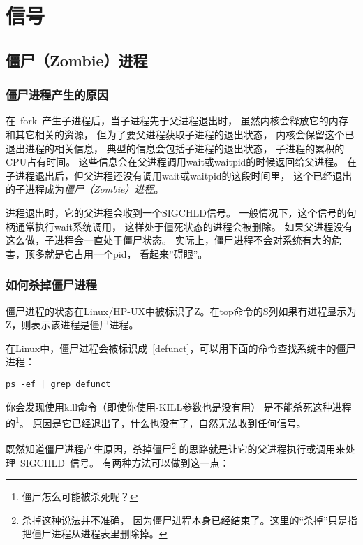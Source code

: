 
\chapter{信号}


\section{僵尸（Zombie）进程}

\subsection{僵尸进程产生的原因}

在~fork~产生子进程后，当子进程先于父进程退出时，
虽然内核会释放它的内存和其它相关的资源，
但为了要父进程获取子进程的退出状态，
内核会保留这个已退出进程的相关信息，
典型的信息会包括子进程的退出状态，
子进程的累积的CPU占有时间。
这些信息会在父进程调用wait或waitpid的时候返回给父进程。
在子进程退出后，但父进程还没有调用wait或waitpid的这段时间里，
这个已经退出的子进程成为\emph{僵尸（Zombie）进程}。

进程退出时，它的父进程会收到一个SIGCHLD信号。
一般情况下，这个信号的句柄通常执行wait系统调用，
这样处于僵死状态的进程会被删除。
如果父进程没有这么做，子进程会一直处于僵尸状态。
实际上，僵尸进程不会对系统有大的危害，顶多就是它占用一个pid，
看起来''碍眼''。

\subsection{如何杀掉僵尸进程}

僵尸进程的状态在Linux/HP-UX中被标识了Z。在top命令的S列如果有进程显示为Z，则表示该进程是僵尸进程。

在Linux中，僵尸进程会被标识成~[defunct]，可以用下面的命令查找系统中的僵尸进程：
\begin{lstlisting}
ps -ef | grep defunct
\end{lstlisting}

你会发现使用kill命令（即使你使用-KILL参数也是没有用）
是不能杀死这种进程的\footnote{僵尸怎么可能被杀死呢？}。
原因是它已经退出了，什么也没有了，自然无法收到任何信号。

既然知道僵尸进程产生原因，杀掉僵尸\footnote{杀掉这种说法并不准确，
因为僵尸进程本身已经结束了。这里的“杀掉”只是指把僵尸进程从进程表里删除掉。}
的思路就是让它的父进程执行或调用来处理~SIGCHLD~信号。
有两种方法可以做到这一点：

